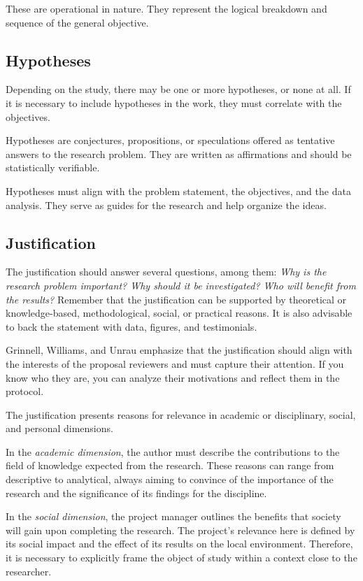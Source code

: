 These are operational in nature. They represent the logical breakdown and sequence of the general objective.

\subsection{Hypotheses}

Depending on the study, there may be one or more hypotheses, or none at all. If it is necessary to include hypotheses in the work, they must correlate with the objectives.

Hypotheses are conjectures, propositions, or speculations offered as tentative answers to the research problem. They are written as affirmations and should be statistically verifiable.

Hypotheses must align with the problem statement, the objectives, and the data analysis. They serve as guides for the research and help organize the ideas.

\subsection{Justification}

The justification should answer several questions, among them: \textit{Why is the research problem important? Why should it be investigated? Who will benefit from the results?} Remember that the justification can be supported by theoretical or knowledge-based, methodological, social, or practical reasons. It is also advisable to back the statement with data, figures, and testimonials.

Grinnell, Williams, and Unrau\cite{grinnell2009} emphasize that the justification should align with the interests of the proposal reviewers and must capture their attention. If you know who they are, you can analyze their motivations and reflect them in the protocol.

The justification presents reasons for relevance in academic or disciplinary, social, and personal dimensions.

In the \textit{academic dimension}, the author must describe the contributions to the field of knowledge expected from the research. These reasons can range from descriptive to analytical, always aiming to convince of the importance of the research and the significance of its findings for the discipline.

In the \textit{social dimension}, the project manager outlines the benefits that society will gain upon completing the research. The project's relevance here is defined by its social impact and the effect of its results on the local environment. Therefore, it is necessary to explicitly frame the object of study within a context close to the researcher.

